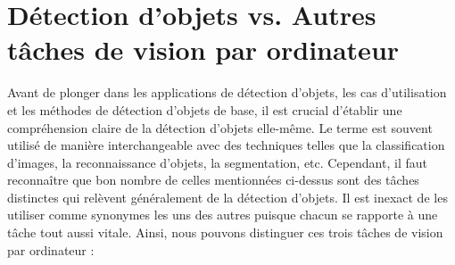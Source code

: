 \section{Détection d'objets vs. Autres tâches de vision par ordinateur}
Avant de plonger dans les applications de détection d'objets, les cas d'utilisation et les méthodes de détection d'objets de base, il est crucial d'établir une compréhension claire de la détection d'objets elle-même. Le terme est souvent utilisé de manière interchangeable avec des techniques telles que la classification d'images, la reconnaissance d'objets, la segmentation, etc. Cependant, il faut reconnaître que bon nombre de celles mentionnées ci-dessus sont des tâches distinctes qui relèvent généralement de la détection d'objets. Il est inexact de les utiliser comme synonymes les uns des autres puisque chacun se rapporte à une tâche tout aussi vitale.
Ainsi, nous pouvons distinguer ces trois tâches de vision par ordinateur :

